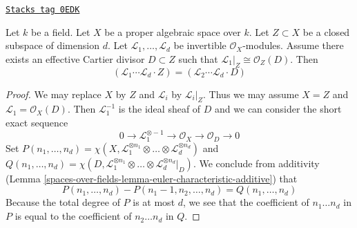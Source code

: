 \begin{lemma}
\label{spaces-over-fields-lemma-numerical-intersection-effective-Cartier-divisor}
\href{https://stacks.math.columbia.edu/tag/0EDK}{\texttt{Stacks tag 0EDK}}

Let $k$ be a field. Let $X$ be a proper algebraic space over $k$.
Let $Z \subset X$ be a closed subspace of dimension $d$.
Let $\mathcal{L}_1, \ldots, \mathcal{L}_d$
be invertible $\mathcal{O}_X$-modules. Assume there exists an
effective Cartier divisor $D \subset Z$ such that
$\mathcal{L}_1|_Z \cong \mathcal{O}_Z(D)$. Then
$$
(\mathcal{L}_1 \cdots \mathcal{L}_d \cdot Z) =
(\mathcal{L}_2 \cdots \mathcal{L}_d \cdot D)
$$
\end{lemma}

\begin{proof}
We may replace $X$ by $Z$ and $\mathcal{L}_i$ by $\mathcal{L}_i|_Z$.
Thus we may assume $X = Z$ and $\mathcal{L}_1 = \mathcal{O}_X(D)$.
Then $\mathcal{L}_1^{-1}$ is the ideal sheaf of $D$ and we can
consider the short exact sequence
$$
0 \to \mathcal{L}_1^{\otimes -1} \to \mathcal{O}_X \to \mathcal{O}_D \to 0
$$
Set
$P(n_1, \ldots, n_d) =
\chi(X, \mathcal{L}_1^{\otimes n_1} \otimes \ldots \otimes
\mathcal{L}_d^{\otimes n_d})$
and
$Q(n_1, \ldots, n_d) =
\chi(D, \mathcal{L}_1^{\otimes n_1} \otimes \ldots \otimes
\mathcal{L}_d^{\otimes n_d}|_D)$.
We conclude from additivity
(Lemma \ref{spaces-over-fields-lemma-euler-characteristic-additive})
that
$$
P(n_1, \ldots, n_d) - P(n_1 - 1, n_2, \ldots, n_d) =
Q(n_1, \ldots, n_d)
$$
Because the total degree of $P$ is at most $d$, we see that
the coefficient of $n_1 \ldots n_d$ in $P$ is equal to the coefficient
of $n_2 \ldots n_d$ in $Q$.
\end{proof}



